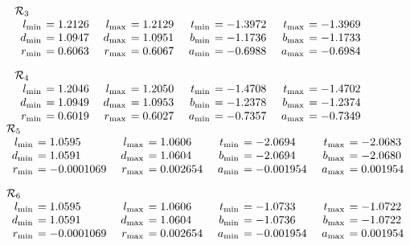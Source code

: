 \begin{small}
$$\begin{array}{rlrlrlrl}
\noalign{\noindent  ${\cal R}_3$}
\noalign{\vskip2pt}
l_{\rm min} &\hskip-6pt =  1.2126&\enspace    l_{\rm max} &\hskip-6pt = 1.2129&\enspace   
t_{\rm min} &\hskip-6pt =  -1.3972&\enspace    t_{\rm max}&\hskip-6pt  = -1.3969\\
d_{\rm min} &\hskip-6pt =  1.0947&  d_{\rm
max}&\hskip-6pt  = 1.0951&   b_{\rm min} &\hskip-6pt =  -1.1736&  b_{\rm max}&\hskip-6pt  = -1.1733\\
r_{\rm min} &\hskip-6pt =  0.6063& 
r_{\rm max}&\hskip-6pt  = 0.6067&   a_{\rm min} &\hskip-6pt =  -0.6988&  a_{\rm max}&\hskip-6pt  = -0.6984\end{array}
$$

$$\begin{array}{rlrlrlrl}
\noalign{\noindent  ${\cal R}_4$}
\noalign{\vskip2pt}
l_{\rm min} &\hskip-6pt =  1.2046&\enspace    l_{\rm max}&\hskip-6pt  = 1.2050&\enspace   
t_{\rm min} &\hskip-6pt =  -1.4708&\enspace    t_{\rm max}&\hskip-6pt = -1.4702\\
d_{\rm min} &\hskip-6pt =  1.0949&  d_{\rm
max}&\hskip-6pt  = 1.0953&   b_{\rm min} &\hskip-6pt =  -1.2378&  b_{\rm max} &\hskip-6pt = -1.2374\\
r_{\rm min} &\hskip-6pt =  0.6019& 
r_{\rm max} &\hskip-6pt = 0.6027&   a_{\rm min} &\hskip-6pt =  -0.7357&  a_{\rm max} &\hskip-6pt = -0.7349\end{array}$$

$$\begin{array}{rlrlrlrl}
\noalign{\vskip-10pt}
\noalign{\noindent  ${\cal R}_5$}
\noalign{\vskip2pt}
l_{\rm min} &\hskip-6pt =  1.0595&\enspace    l_{\rm max}&\hskip-6pt = 1.0606&\enspace   
t_{\rm min}&\hskip-6pt =  -2.0694&\enspace   t_{\rm max} &\hskip-6pt = -2.0683\\
d_{\rm min} &\hskip-6pt =  1.0591&  d_{\rm
max}&\hskip-6pt  = 1.0604&   b_{\rm min} &\hskip-6pt =  -2.0694&  b_{\rm max}&\hskip-6pt  = -2.0680\\
r_{\rm min} &\hskip-6pt =  -0.0001069&  r_{\rm max} &\hskip-6pt =  0.002654&  a_{\rm min} &\hskip-6pt =  -0.001954&  a_{\rm max}
&\hskip-6pt =  0.001954\end{array}$$

$$\begin{array}{rlrlrlrl}
\noalign{\noindent  ${\cal R}_6$}
\noalign{\vskip2pt}
l_{\rm min} &\hskip-6pt =  1.0595&\enspace    l_{\rm max} &\hskip-6pt =  1.0606&\enspace   
t_{\rm min} &\hskip-6pt =  -1.0733&\enspace    t_{\rm max} &\hskip-6pt =  -1.0722\\
d_{\rm min} &\hskip-6pt =  1.0591&  d_{\rm max}
&\hskip-6pt =  1.0604&   b_{\rm min} &\hskip-6pt =  -1.0736&  b_{\rm max} &\hskip-6pt =  -1.0722\\
r_{\rm min} &\hskip-6pt =  -0.0001069& 
r_{\rm max} &\hskip-6pt =  0.002654&   a_{\rm min} &\hskip-6pt =  -0.001954&  a_{\rm max} &\hskip-6pt =  0.001954\end{array}$$
\end{small}

